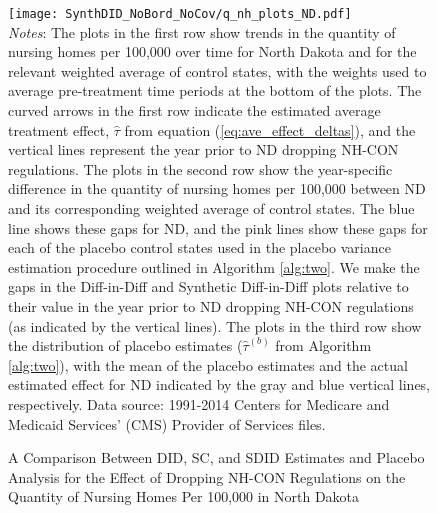 \documentclass[../Main.tex]{subfiles}
\begin{document}
\newpage
{}
\begin{figure}[t] 
    \setlength{}
	\caption{\label{fig:q_nh_plots_nd} \centering A Comparison Between DID, SC, and SDID Estimates and Placebo Analysis for the Effect of Dropping NH-CON Regulations on the Quantity of Nursing Homes Per 100,000 in North Dakota} {\centering\texttt{[image: SynthDID\_NoBord\_NoCov/q\_nh\_plots\_ND.pdf]}}
    \vspace{-1.4cm}\\
    \scriptsize
		\textit{Notes}: The plots in the first row show trends in the quantity of nursing homes per 100,000 over time for North Dakota and for the relevant weighted average of control states, with the weights used to average pre-treatment time periods at the bottom of the plots. The curved arrows in the first row indicate the estimated average treatment effect, $\hat{\tau}$ from equation (\ref{eq:ave_effect_deltas}), and the vertical lines represent the year prior to ND dropping NH-CON regulations. The plots in the second row show the year-specific difference in the quantity of nursing homes per 100,000 between ND and its corresponding weighted average of control states. The blue line shows these gaps for ND, and the pink lines show these gaps for each of the placebo control states used in the placebo variance estimation procedure outlined in Algorithm \ref{alg:two}. We make the gaps in the Diff-in-Diff and Synthetic Diff-in-Diff plots relative to their value in the year prior to ND dropping NH-CON regulations (as indicated by the vertical lines). The plots in the third row show the distribution of placebo estimates ($\hat{\tau}^{(b)}$ from Algorithm \ref{alg:two}), with the mean of the placebo estimates and the actual estimated effect for ND indicated by the gray and blue vertical lines, respectively. Data source: 1991-2014 Centers for Medicare and Medicaid Services’ (CMS) Provider of Services files.
\end{figure}
\restoregeometry
\clearpage
\end{document}
